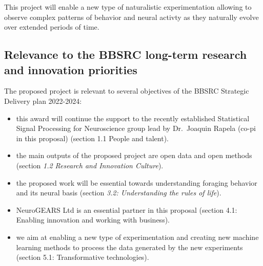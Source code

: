 This project will enable a new type of naturalistic experimentation allowing to
observe complex patterns of behavior and neural activty as they naturally
evolve over extended periods of time.

\subsection{Relevance to the BBSRC long-term research and innovation
priorities}

The proposed project is relevant to several objectives of the BBSRC
Strategic Delivery plan 2022-2024:

\begin{itemize}

    \item this award will continue the support to the recently established
        Statistical Signal Processing for Neuroscience group lead by
        Dr.~Joaquin Rapela (co-pi in this proposal) (section 1.1 People and
        talent).

    \item the main outputs of the proposed project are open data and open
        methods (section \emph{1.2 Research and Innovation Culture}).

    \item the proposed work will be essential towards understanding foraging
        behavior and its neural basis (section \emph{3.2: Understanding the
        rules of life}).

    \item NeuroGEARS Ltd is an essential partner in this proposal (section 4.1:
        Enabling innovation and working with business).

    \item we aim at enabling a new type of experimentation and
        creating new machine learning methods to process the data generated by
        the new experiments (section 5.1: Transformative technologies).

\end{itemize}

